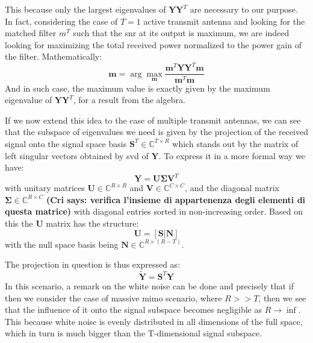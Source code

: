 \documentclass[11pt]{book}
\newcommand{\argmax}{\arg\!\max} %
\newcommand{\cri}[1]{\textcolor{MyColor2}{\textbf{(Cri says: #1)}}}
\begin{document}
This because only the largest eigenvalues of $\mathbf{Y}\mathbf{Y}^T$ are necessary to our purpose. In fact, considering the case of $T = 1$ active transmit antenna and looking for the matched filter $m^T$ such that the \gls{snr} at its output is maximum, we are indeed looking for maximizing the total received power normalized to the power gain of the filter. Mathematically:
\begin{equation}
  \mathbf{m} = \argmax_{\mathbf{m}}\frac{\mathbf{m}^T\mathbf{Y}\mathbf{Y}^T\mathbf{m}}{\mathbf{m}^T\mathbf{m}}
\end{equation}
And in such case, the maximum value is exactly given by the maximum eigenvalue of $\mathbf{Y}\mathbf{Y}^T$, for a result from the algebra.

If we now extend this idea to the case of multiple transmit antennas, we can see that the subspace of eigenvalues we need is given by the projection of the received signal onto the signal space basis $\mathbf{S}^T \in \mathbb{C}^{T\times R}$ which stands out by the matrix of left singular vectors obtained by \gls{svd} of $\mathbf{Y}$. To express it in a more formal way we have:
\begin{equation}
  \mathbf{Y} = \mathbf{U} \mathbf{\Sigma} \mathbf{V}^T
\end{equation}
with unitary matrices $\mathbf{U} \in \mathbb{C}^{R\times R}$ and $\mathbf{V} \in \mathbb{C}^{C\times C}$, and the diagonal matrix $\mathbf{\Sigma} \in \mathbb{C}^{R\times C}$ \cri{verifica l'insieme di appartenenza degli elementi di questa matrice} with diagonal entries sorted in non-increasing order. Based on this the $\mathbf{U}$ matrix has the structure:
\begin{equation}
  \mathbf{U} = [\mathbf{S|\mathbf{N}}]
\end{equation}
with the null space basis being $\mathbf{N} \in \mathbb{C}^{R\times (R-T)}$.

The projection in question is thus expressed as:
\begin{equation}
  \mathbf{\tilde{Y}} = \mathbf{S}^T\mathbf{Y}
\end{equation}
In this scenario, a remark on the white noise can be done and precisely that if then we consider the case of massive \gls{mimo} scenario, where $R >> T$, then we see that the influence of it onto the signal subspace becomes negligible as $R \rightarrow \inf$. This because white noise is evenly distributed in all dimensions of the full space, which in turn is much bigger than the T-dimensional signal subspace.
\end{document}
